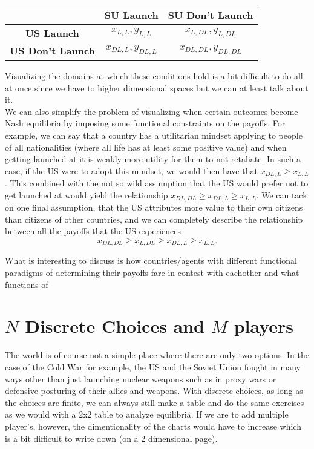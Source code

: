 \documentclass[11pt,english]{article}
\begin{document}
\begin{center}
\begin{tabular}{ c |c |c| }
  & \textbf{SU Launch} & \textbf{SU Don't Launch}\\
\hline 
\textbf{US Launch} & $x_{L,L}, y_{L,L}$ & $x_{L,DL}, y_{L,DL}$  \\
\hline  
\textbf{US Don't Launch} & $x_{DL,L}, y_{DL,L}$ & $x_{DL,DL}, y_{DL,DL}$ \\
\hline
\end{tabular}
\end{center}

\noindent Visualizing the domains at which these conditions hold is a bit difficult to do all at once since we have to higher dimensional spaces but we can at least talk about it.\\

\noindent We can also simplify the problem of visualizing when certain outcomes become Nash equilibria by imposing some functional constraints on the payoffs. For example, we can say that a country has a utilitarian mindset applying to people of all nationalities (where all life has at least some positive value) and when getting launched at it is weakly more utility for them to not retaliate. In such a case, if the US were to adopt this mindset, we would then have that $x_{DL,L} \geq x_{L,L}$. This combined with the not so wild assumption that the US would prefer not to get launched at would yield the relationship $x_{DL,DL} \geq x_{DL,L} \geq x_{L,L}$. We can tack on one final assumption, that the US attributes more value to their own citizens than citizens of other countries, and we can completely describe the relationship between all the payoffs that the US experiences $$x_{DL,DL} \geq x_{L,DL} \geq x_{DL,L} \geq x_{L,L}.$$

\noindent What is interesting to discuss is how countries/agents with different functional paradigms of determining their payoffs fare in contest with eachother and what functions of 

\section*{$N$ Discrete Choices and $M$ players}

The world is of course not a simple place where there are only two options. In the case of the Cold War for example, the US and the Soviet Union fought in many ways other than just launching nuclear weapons such as in proxy wars or defensive posturing of their allies and weapons. With discrete choices, as long as the choices are finite, we can always still make a table and do the same exercises as we would with a 2x2 table to analyze equilibria. If we are to add multiple player's, however, the dimentionality of the charts would have to increase which is a bit difficult to write down (on a 2 dimensional page). \\
\end{document}
